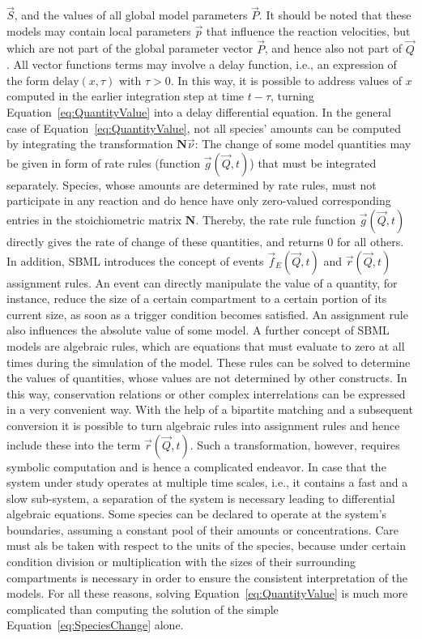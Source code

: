 \documentclass[10pt]{bmc_article}
\newenvironment{bmcformat}{\baselineskip20pt\sloppy\setboolean{publ}{false}}{\baselineskip20pt\sloppy}
\begin{document}
\begin{bmcformat}
$\vec{S}$, and the values of all global model parameters $\vec{P}$.
It should be noted that these models may contain local parameters $\vec{p}$ that
influence the reaction velocities, but which are not part of the global parameter
vector $\vec{P}$, and hence also not part of $\vec{Q}$. All vector functions terms
may involve a delay function, i.e., an expression of the form $\mathrm{delay}(x, \tau)$
with $\tau > 0$. In this way, it is possible to address values of $x$ computed in
the earlier integration step at time $t - \tau$, turning Equation~\ref{eq:QuantityValue}
into a delay differential equation.
In the general case of Equation~\ref{eq:QuantityValue}, not all species' amounts
can be computed by integrating the transformation $\mathbf{N}\vec{\nu}$: The
change of some model quantities may be given in form of rate rules (function
$\vec{g}(\vec{Q}, t)$) that must be integrated separately.
Species, whose amounts are determined by rate rules, must not participate in any
reaction and do hence have only zero-valued corresponding entries in the
stoichiometric matrix $\mathbf{N}$.
Thereby, the rate rule function $\vec{g}(\vec{Q}, t)$ directly gives the rate of
change of these quantities, and returns 0 for all others.
In addition, SBML introduces the concept of events $\vec{f}_E(\vec{Q}, t)$ and
$\vec{r}(\vec{Q}, t)$ assignment rules.
An event can directly manipulate the value of a quantity, for instance,
reduce the size of a certain compartment to a certain portion of its current size,
as soon as a trigger condition becomes satisfied.
An assignment rule also influences the absolute value of some model.
A further concept of SBML models are algebraic rules, which are equations that
must evaluate to zero at all times during the simulation of the model.
These rules can be solved to determine the values of quantities, whose values
are not determined by other constructs.
In this way, conservation relations or other complex interrelations can be
expressed in a very convenient way.
With the help of a bipartite matching and a subsequent conversion it is possible
to turn algebraic rules into assignment rules and hence include these into the
term $\vec{r}(\vec{Q}, t)$.
Such a transformation, however, requires symbolic computation and is
hence a complicated endeavor.
In case that the system under study operates at multiple time scales, i.e., it
contains a fast and a slow sub-system, a separation of the system is necessary
leading to differential algebraic equations.
Some species can be declared to operate at the system's boundaries, assuming a
constant pool of their amounts or concentrations.
Care must als be taken with respect to the units of the species, because under
certain condition division or multiplication with the sizes of their surrounding
compartments is necessary in order to ensure the consistent interpretation of
the models. 
For all these reasons, solving Equation~\ref{eq:QuantityValue} is much more 
complicated than computing the solution of the simple Equation~\ref{eq:SpeciesChange}
alone.


\end{bmcformat}
\end{document}
